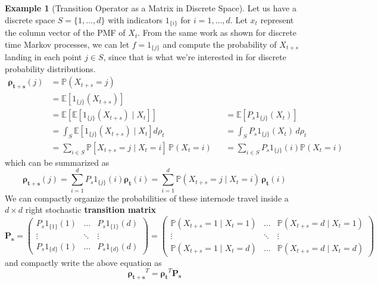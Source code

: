 \documentclass{article}
\theoremstyle{definition}
\newtheorem{example}{Example}[section]
\theoremstyle{remark}
\theoremstyle{definition}
\begin{document}
\begin{example}[Transition Operator as a Matrix in Discrete Space]
Let us have a discrete space $S = \{1, \ldots, d\}$ with indicators $1_{\{i\}}$ for $i = 1, \ldots, d$. Let $x_t$ represent the column vector of the PMF of $X_t$. From the same work as shown for discrete time Markov processes, we can let $f = 1_{\{j\}}$ and compute the probability of $X_{t + s}$ landing in each point $j \in S$, since that is what we're interested in for discrete probability distributions. 
\begin{align*}
    \boldsymbol{\rho_{t + s}} (j) & = \mathbb{P}( X_{t + s} = j) \\ 
    & = \mathbb{E}[1_{\{j\}} (X_{t + s})] \\
    & = \mathbb{E} [ \mathbb{E}[ 1_{\{j\}} (X_{t + s}) \mid X_t] ] && = \mathbb{E}[P_s 1_{\{j\}} (X_t)] \\
    & = \int_S \mathbb{E}[ 1_{\{j\}} (X_{t + s}) \mid X_t] d\rho_t && = \int_S P_s 1_{\{j\}} (X_t) \,d \rho_t \\
    & = \sum_{i \in S} \mathbb{P}[ X_{t + s} = j \mid X_t = i] \, \mathbb{P} ( X_t = i) && = \sum_{i \in S} P_s 1_{\{j\}} (i) \mathbb{P}(X_t = i) 
\end{align*}
which can be summarized as 
\[\boldsymbol{\rho_{t + s}} (j) = \sum_{i = 1}^d P_s 1_{\{j\}} (i) \boldsymbol{\rho_t} (i) = \sum_{i = 1}^d \mathbb{P}(X_{t + s} = j \mid X_t = i) \, \boldsymbol{\rho_t} (i)\]
We can compactly organize the probabilities of these internode travel inside a $d \times d$ right stochastic \textbf{transition matrix}
\[\mathbf{P_s} = \begin{pmatrix} P_s 1_{\{1\}} (1) & \ldots & P_s 1_{\{1\}} (d) \\ \vdots & \ddots & \vdots \\ P_s 1_{\{d\}} (1) & \ldots & P_s 1_{\{d\}} (d) \end{pmatrix} = \begin{pmatrix} \mathbb{P}(X_{t + s} = 1 \mid X_t = 1) & \ldots & \mathbb{P}(X_{t + s} = d \mid X_t = 1) \\ \vdots & \ddots & \vdots \\ \mathbb{P}(X_{t + s} = 1 \mid X_t = d) & \ldots & \mathbb{P}(X_{t + s} = d \mid X_t = d) \end{pmatrix} \]
and compactly write the above equation as 
\[\boldsymbol{\rho_{t + s}}^T = \boldsymbol{\rho_{t}}^T \mathbf{P_s}\]
\end{example}
\end{document}
